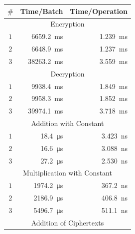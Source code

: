 \documentclass{article}
\begin{document}
    \begin{table}[h]
        \begin{center}
            \begin{tabular}{| c | r | r |}
                \hline
                $\#$ & Time/Batch & Time/Operation
                \\ \hline
                \multicolumn{3}{|c|}{Encryption}
                \\ \hline
                $1$ & \SI{6659.2}{\milli\second} & \SI{1.239}{\milli\second}
                \\ \hline
                $2$ & \SI{6648.9}{\milli\second} & \SI{1.237}{\milli\second}
                \\ \hline
                $3$ & \SI{38263.2}{\milli\second} & \SI{3.559}{\milli\second}
                \\ \hline
                \multicolumn{3}{|c|}{Decryption}
                \\ \hline
                $1$ & \SI{9938.4}{\milli\second} & \SI{1.849}{\milli\second}
                \\ \hline
                $2$ & \SI{9958.3}{\milli\second} & \SI{1.852}{\milli\second}
                \\ \hline
                $3$ & \SI{39974.1}{\milli\second} & \SI{3.718}{\milli\second}
                \\ \hline
                \multicolumn{3}{|c|}{Addition with Constant}
                \\ \hline
                $1$ & \SI{18.4}{\micro\second} & \SI{3.423}{\nano\second}
                \\ \hline
                $2$ & \SI{16.6}{\micro\second} & \SI{3.088}{\nano\second}
                \\ \hline
                $3$ & \SI{27.2}{\micro\second} & \SI{2.530}{\nano\second}
                \\ \hline
                \multicolumn{3}{|c|}{Multiplication with Constant}
                \\ \hline
                $1$ & \SI{1974.2}{\micro\second} & \SI{367.2}{\nano\second}
                \\ \hline
                $2$ & \SI{2186.9}{\micro\second} & \SI{406.8}{\nano\second}
                \\ \hline
                $3$ & \SI{5496.7}{\micro\second} & \SI{511.1}{\nano\second}
                \\ \hline
                \multicolumn{3}{|c|}{Addition of Ciphertexts}

\end{tabular}
\end{center}
\end{table}
\end{document}
